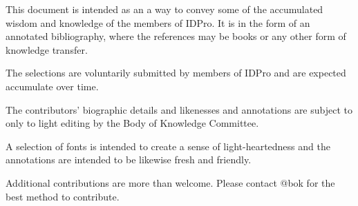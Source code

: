 This document is intended as an a way to convey some of the accumulated wisdom and knowledge of the members of IDPro. 
It is in the form of an annotated bibliography, where the references may be books or any other form of knowledge transfer.

The selections are voluntarily submitted by members of IDPro and are expected accumulate over time. 

The contributors' biographic details and likenesses and annotations are subject to only to light editing by the Body of Knowledge Committee.

A selection of fonts is intended to create a sense of light-heartedness and the annotations are intended to be likewise fresh and friendly.

Additional contributions are more than welcome.  Please contact @bok for the best method to contribute.